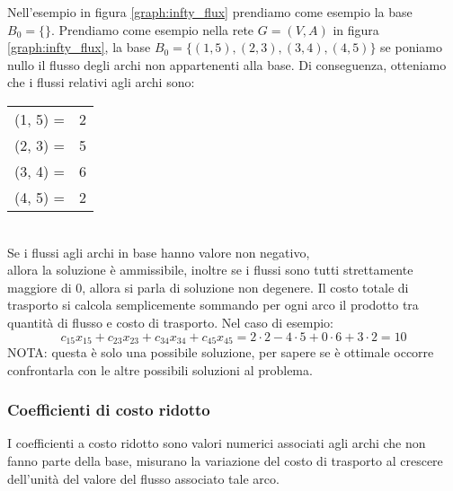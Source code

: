 \documentclass[../template]{subfiles}
\begin{document}
\vspace{10pt}
Nell'esempio in figura \ref{graph:infty_flux} prendiamo come esempio la base $B_0 = \{\}$.
Prendiamo come esempio nella rete $G = (V, A)$ in figura \ref{graph:infty_flux}, la
base $B_0 = \{(1, 5), (2, 3), (3, 4), (4, 5)\}$ se poniamo nullo il flusso degli archi
non appartenenti alla base.
Di conseguenza, otteniamo che i flussi relativi agli archi sono:

\vspace{10pt}
\begin{tabular}{cc}
    (1, 5) = &2\\
    (2, 3) = &5\\
    (3, 4) = &6\\
    (4, 5) = &2
\end{tabular}
\\[10pt]
Se i flussi agli archi in base hanno valore non negativo,
\\
allora la soluzione è ammissibile, inoltre se i flussi sono tutti strettamente
maggiore di 0, allora si parla di soluzione non degenere.
Il costo totale di trasporto si calcola semplicemente sommando per ogni arco il prodotto tra
quantità di flusso e costo di trasporto. Nel caso di esempio:
\[
    c_{15} x_{15} + c_{23} x_{23} + c_{34} x_{34} + c_{45} x_{45} =
    2 \cdot 2 - 4 \cdot 5 + 0 \cdot 6 + 3 \cdot 2 = 10
\]
NOTA: questa è solo una possibile soluzione, per sapere se è ottimale occorre confrontarla con
le altre possibili soluzioni al problema.
\subsubsection{Coefficienti di costo ridotto}
I coefficienti a costo ridotto sono valori numerici associati agli archi che non fanno parte della
base, misurano la variazione del costo di trasporto al crescere dell'unità del valore del flusso
associato tale arco.
\end{document}
